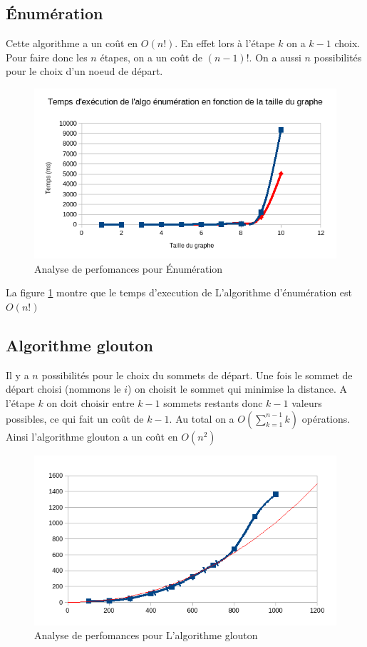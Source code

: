 \documentclass[11pt]{article} \usepackage[top=2cm, bottom=2cm, left=2cm, right=2cm]{geometry}
\begin{document}
\subsection*{\'Enumération}
Cette algorithme a un coût en $O(n!)$. En effet lors à l'étape $k$ on a $k-1$ choix. Pour faire donc les $n$ étapes, on
a un coût de $(n-1)!$. On  a aussi $n$ possibilités pour le choix d'un noeud de départ.
  \begin{figure}[ht]
\begin{center}
  
  \includegraphics[scale=0.8]{images/exec_enum.png}
  \caption{Analyse de perfomances pour \'Enumération}
  \label{fig:enum}
\end{center}
\end{figure}
La figure \ref{fig:enum} montre que le temps d'execution de L'algorithme d'énumération est $O(n!)$
\subsection*{Algorithme glouton}
Il y a $n$ possibilités pour le choix du sommets de départ. Une fois le sommet de départ choisi (nommons le $i$) on choisit le sommet qui
minimise la distance. A l'étape $k$ on doit choisir entre $k-1$ sommets restants donc $k-1$ valeurs possibles, ce qui fait un coût de $k-1$. Au
total on a $O(\sum_{k=1}^{n-1} k)$ opérations. 
Ainsi l'algorithme glouton a un coût en $O(n^2)$
  \begin{figure}[ht]
\begin{center}
  
  \includegraphics[scale=0.8]{images/exec_glouton.png}
  \caption{Analyse de perfomances pour L'algorithme glouton}
  \label{fig:glouton}
\end{center}
\end{figure}
\end{document}
